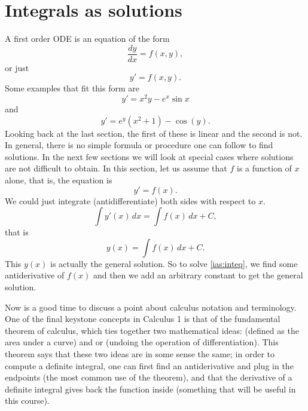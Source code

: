 \section{Integrals as solutions}
\label{integralsols:section}




A first order ODE is an equation of the form
\begin{equation*}
\frac{dy}{dx} = f(x,y) ,
\end{equation*}
or just
\begin{equation*}
y' = f(x,y) .
\end{equation*} Some examples that fit this form are
\[ y' = x^2y - e^x \sin{x} \] and
\[ y' = e^y(x^2 + 1) - \cos(y). \] Looking back at the last section, the first of these is linear and the second is not. 
In general, there is no simple formula or procedure one can follow to find
solutions.
In the next few sections we will look at special cases where solutions are not
difficult to obtain.
In this section, let us assume that $f$ is a function of $x$ alone,
that is, the equation is
\begin{equation} \label{ias:inteq}
y' = f(x) .
\end{equation}
We could just integrate (antidifferentiate) both sides with respect to $x$.
\begin{equation*}
\int y'(x) \,dx = \int f(x) \,dx + C ,
\end{equation*}
that is
\begin{equation*}
y(x) = \int f(x) \,dx + C .
\end{equation*}
This $y(x)$ is actually the general solution.
So to solve \eqref{ias:inteq},
we find some antiderivative of $f(x)$
and then we add an arbitrary constant to get the general solution.

\medskip

Now is a good time to discuss a point about
calculus notation and terminology.  One of the final keystone concepts in Calculus 1 is that of the fundamental theorem of calculus, which ties together two mathematical ideas:  (defined as the area under a curve) and  or  (undoing the operation of differentiation). This theorem says that these two ideas are in some sense the same; in order to compute a definite integral, one can first find an antiderivative and plug in the endpoints (the most common use of the theorem), and that the derivative of a definite integral gives back the function inside (something that will be useful in this course).

